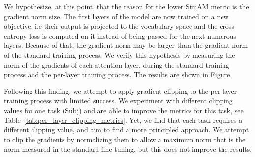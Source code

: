 \documentclass[11pt]{article}
\begin{document}
We hypothesize, at this point, that the reason for the lower SimAM metric is the gradient norm size.
The first layers of the model are now trained on a new objective, i.e their output is projected to the vocabulary space and the cross-entropy loss is computed on it instead of being passed for the next numerous layers.
Because of that, the gradient norm may be larger than the gradient norm of the standard training process.
We verify this hypothesis by measuring the norm of the gradients of each attention layer, during the standard training process and the per-layer training process.
The results are shown in Figure.

Following this finding, we attempt to apply gradient clipping to the per-layer training process with limited success.
We experiment with different clipping values for one task (Subj) and are able to improve the metrics for this task, see Table~\ref{tab:per_layer_clipping_metrics}.
Yet, we find that each task requires a different clipping value, and aim to find a more principled approach.
We attempt to clip the gradients by normalizing them to allow a maximum norm that is the norm measured in the standard fine-tuning, but this does not improve the results.
\end{document}
